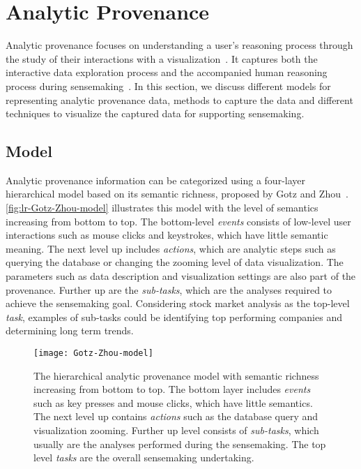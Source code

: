 \section{Analytic Provenance}
Analytic provenance focuses on understanding a user's reasoning process through the study of their interactions with a visualization~\cite{North2011}. It captures both the interactive data exploration process and the accompanied human reasoning process during sensemaking~\cite{Xu2015}. In this section, we discuss different models for representing analytic provenance data, methods to capture the data and different techniques to visualize the captured data for supporting sensemaking.

\subsection{Model}
Analytic provenance information can be categorized using a four-layer hierarchical model based on its semantic richness, proposed by Gotz and Zhou~\cite{Gotz2009}. \autoref{fig:lr-Gotz-Zhou-model} illustrates this model with the level of semantics increasing from bottom to top. The bottom-level \emph{events} consists of low-level user interactions such as mouse clicks and keystrokes, which have little semantic meaning. The next level up includes \emph{actions}, which are analytic steps such as querying the database or changing the zooming level of data visualization. The parameters such as data description and visualization settings are also part of the provenance. Further up are the \emph{sub-tasks}, which are the analyses required to achieve the sensemaking goal. Considering stock market analysis as the top-level \emph{task}, examples of sub-tasks could be identifying top performing companies and determining long term trends. 

\begin{figure}[!htb]
	\centering
	\texttt{[image: Gotz-Zhou-model]}
	\caption{The hierarchical analytic provenance model with semantic richness increasing from bottom to top. The bottom layer includes \emph{events} such as key presses and mouse clicks, which have little semantics. The next level up contains \emph{actions} such as the database query and visualization zooming. Further up level consists of \emph{sub-tasks}, which usually are the analyses performed during the sensemaking. The top level \emph{tasks} are the overall sensemaking undertaking. }
	\label{fig:lr-Gotz-Zhou-model}
\end{figure}

